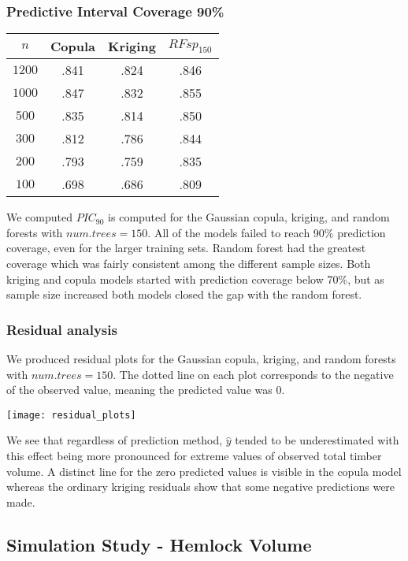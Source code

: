 \documentclass{article}
\begin{document}
\subsubsection{Predictive Interval Coverage 90\%}
\begin{center}
\begin{tabular}{|| c | c c c ||}
\hline
$n$ & Copula & Kriging & $RFsp_{150}$ \\ [.5ex] 
\hline\hline
	$1200$ & .841 & .824 & .846 \\
	$1000$ & .847 & .832 & .855 \\
	$500$ & .835 & .814 & .850 \\
	$300$ & .812 & .786 & .844 \\
	$200$ & .793 & .759 & .835 \\
	$100$ & .698 & .686 & .809 \\ [.5ex] 
\hline
\end{tabular}
\end{center}
We computed $PIC_{90}$ is computed for the Gaussian copula, kriging, and random forests with $num.trees=150$.
All of the models failed to reach 90\% prediction coverage, even for the larger training sets.
Random forest had the greatest coverage which was fairly consistent among the different sample sizes.
Both kriging and copula models started with prediction coverage below 70\%, but as sample size increased both models closed the gap with the random forest.

\subsubsection{Residual analysis}

We produced residual plots for the Gaussian copula, kriging, and random forests with $num.trees=150$.
The dotted line on each plot corresponds to the negative of the observed value, meaning the predicted value was 0.
\begin{center}
\texttt{[image: residual\_plots]}
\end{center}
We see that regardless of prediction method, $\hat{y}$ tended to be underestimated with this effect being more pronounced for extreme values of observed total timber volume.
A distinct line for the zero predicted values is visible in the copula model whereas the ordinary kriging residuals show that some negative predictions were made.

\subsection{Simulation Study - Hemlock Volume}
\end{document}
